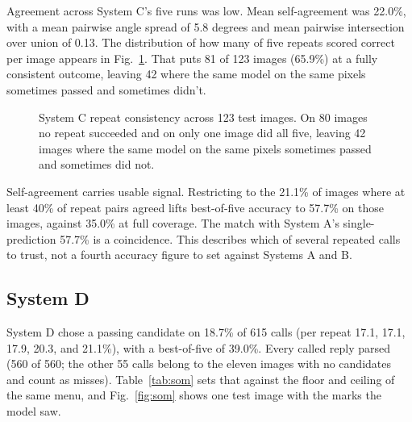 \documentclass[12pt,letterpaper]{article}
\begin{document}
Agreement across System C's five runs was low. Mean self-agreement was
22.0\%, with a mean pairwise angle spread of 5.8 degrees and mean
pairwise intersection over union of 0.13. The distribution of how many
of five repeats scored correct per image appears in
Fig.~\ref{fig:repeats}. That puts 81 of 123 images (65.9\%) at a fully
consistent outcome, leaving 42 where the same model on the same pixels
sometimes passed and sometimes didn't.

\begin{figure}[H]
\centering
{}
\caption{System C repeat consistency across 123 test images. On 80
images no repeat succeeded and on only one image did all five, leaving
42 images where the same model on the same pixels sometimes passed and
sometimes did not.}
\label{fig:repeats}
\end{figure}

Self-agreement carries usable signal. Restricting to the 21.1\% of
images where at least 40\% of repeat pairs agreed lifts best-of-five
accuracy to 57.7\% on those images, against 35.0\% at full coverage.
The match with System A's single-prediction 57.7\% is a coincidence.
This describes
which of several repeated calls to trust, not a fourth accuracy figure
to set against Systems A and B.

\subsection{System D}

System D chose a passing candidate on 18.7\% of 615 calls (per repeat
17.1, 17.1, 17.9, 20.3, and 21.1\%), with a best-of-five of 39.0\%.
Every called reply parsed (560 of 560; the other 55 calls belong to the
eleven images with no candidates and count as misses).
Table~\ref{tab:som} sets that against the floor and ceiling of the
same menu, and Fig.~\ref{fig:som} shows one test image with the marks
the model saw.
\end{document}
